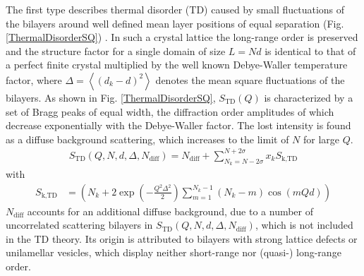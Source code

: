 The first type describes thermal disorder (TD) caused by small
fluctuations of the bilayers around well defined mean layer
positions of equal separation (Fig. \ref{ThermalDisorderSQ}) \cite{Pabst2003,Fruhwirth2004}. In
such a crystal lattice the long-range order is preserved and the
structure factor for a single domain of size $L = Nd$ is identical
to that of a perfect finite crystal multiplied by the well known
Debye-Waller temperature factor, where $\Delta = \left<
(d_k-d)^2\right>$ denotes the mean square fluctuations of the
bilayers. As shown in Fig. \ref{ThermalDisorderSQ},
$S_\text{TD}(Q)$ is characterized by a set of Bragg peaks of equal
width, the diffraction order amplitudes of which decrease
exponentially with the Debye-Waller factor. The lost intensity is
found as a diffuse background scattering, which increases to the
limit of $N$ for large $Q$.
\begin{align}
S_\text{TD}(Q,N,d,\Delta,N_\text{diff}) = N_\text{diff} + \sum_{N_k=N-2\sigma}^{N+2\sigma} x_k
S_\text{k,TD}
\end{align}
with
\begin{align}
S_\text{k,TD} & = \left( N_k + 2 \exp\left(
-\frac{Q^2\Delta^2}{2}\right) \sum_{m=1}^{N_k-1} (N_k-m) \cos(mQd)
\right)
\end{align}
$N_\text{diff}$ accounts for an additional
diffuse background, due to a number of uncorrelated
scattering bilayers in $S_\text{TD}(Q,N,d,\Delta,N_\text{diff})$,
which is not included in the TD theory.
Its origin is attributed to bilayers with strong lattice defects or
unilamellar vesicles, which display neither short-range nor
(quasi-) long-range order.

